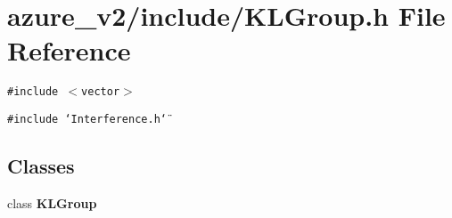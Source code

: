 \section{azure\_\-v2/include/KLGroup.h File Reference}
\label{KLGroup_8h}
{\tt \#include $<$vector$>$}\par
{\tt \#include \char`\"{}Interference.h\char`\"{}}\par
\subsection*{Classes}
\begin{CompactItemize}
\item 
class \bf{KLGroup}
\end{CompactItemize}
